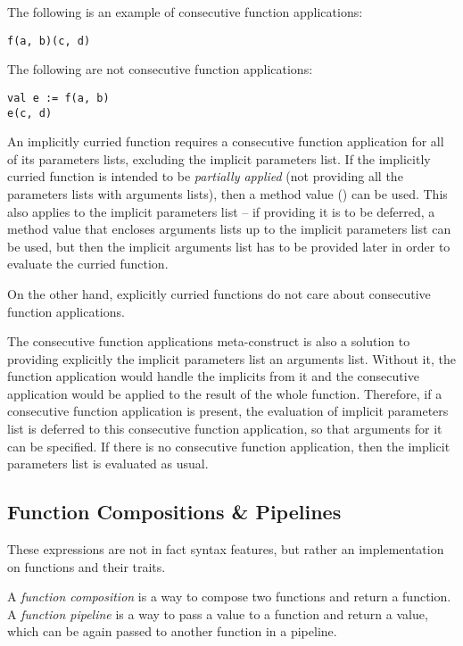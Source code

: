 \example The following is an example of consecutive function applications:
\begin{lstlisting}
f(a, b)(c, d)
\end{lstlisting}
The following are not consecutive function applications:
\begin{lstlisting}
val e := f(a, b)
e(c, d)
\end{lstlisting}

An implicitly curried function requires a consecutive function application for all of its parameters lists, excluding the implicit parameters list. If the implicitly curried function is intended to be {\em partially applied} (not providing all the parameters lists with arguments lists), then a method value () can be used. This also applies to the implicit parameters list -- if providing it is to be deferred, a method value that encloses arguments lists up to the implicit parameters list can be used, but then the implicit arguments list has to be provided later in order to evaluate the curried function. 

On the other hand, explicitly curried functions do not care about consecutive function applications. 

The consecutive function applications meta-construct is also a solution to providing explicitly the implicit parameters list an arguments list. Without it, the function application would handle the implicits from it and the consecutive application would be applied to the result of the whole function. Therefore, if a consecutive function application is present, the evaluation of implicit parameters list is deferred to this consecutive function application, so that arguments for it can be specified. If there is no consecutive function application, then the implicit parameters list is evaluated as usual. 





\subsection{Function Compositions \& Pipelines}
\label{sec:function-compositions}
\label{sec:function-pipelines}

These expressions are not in fact syntax features, but rather an implementation on functions and their traits. 

A {\em function composition} is a way to compose two functions and return a function. A {\em function pipeline} is a way to pass a value to a function and return a value, which can be again passed to another function in a pipeline. 

